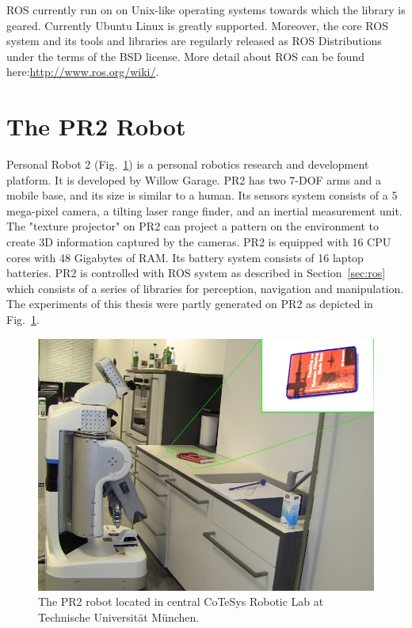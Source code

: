 ROS currently run on on Unix-like operating systems towards which the library is
geared. Currently Ubuntu Linux is greatly supported. Moreover, the core
ROS system and its tools and libraries are regularly released as ROS
Distributions~\cite{rosintroduction} under the terms of the BSD
license. More detail about ROS can be found here:\url{http://www.ros.org/wiki/}.
\section{The PR2 Robot}
\label{sec:pr2}
Personal Robot 2 (Fig.~\ref{fig:pr2}) is a personal robotics research and development
platform.  It is developed by Willow Garage.  PR2 has two 7-DOF arms and a mobile
base, and its size  is similar to a human. Its sensors system consists of a 5
mega-pixel camera, a tilting laser range finder, and an inertial
measurement unit. The "texture projector" on PR2 can project a pattern
on the environment to create 3D information captured by the
cameras. PR2 is equipped with 16 CPU cores with 48 Gigabytes of
RAM. Its battery system consists of 16 laptop batteries. PR2 is
controlled with ROS system as described in Section~\ref{sec:ros} which
consists of a series of libraries for perception, navigation and
manipulation.
The experiments of this thesis were partly generated on PR2 as
depicted in Fig.~\ref{fig:pr2}.

\begin{figure}[htbp]
  \centering
\includegraphics[width=\linewidth]{images/pr2.jpg}
  \caption[The PR2 robot]{The PR2 robot located in central CoTeSys
    Robotic Lab at Technische Universit\"at M\"unchen.}
  \label{fig:pr2}
\end{figure}

